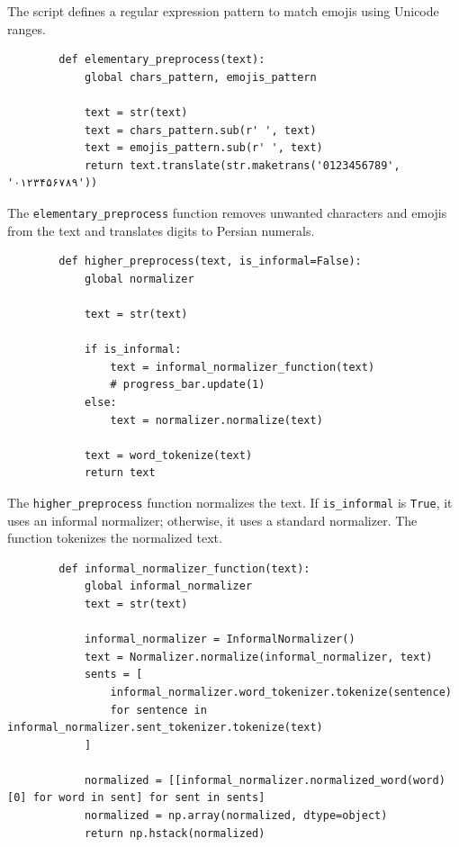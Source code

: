 \documentclass{solutionclass} %
\begin{document}
\begin{solution}
        The script defines a regular expression pattern to match emojis using Unicode ranges.
        
        \begin{lstlisting}
        def elementary_preprocess(text):
            global chars_pattern, emojis_pattern
        
            text = str(text)
            text = chars_pattern.sub(r' ', text)
            text = emojis_pattern.sub(r' ', text)
            return text.translate(str.maketrans('0123456789', '۰۱۲۳۴۵۶۷۸۹'))
        \end{lstlisting}
        
        The \texttt{elementary\_preprocess} function removes unwanted characters and emojis from the text and translates digits to Persian numerals.
        
        \begin{lstlisting}
        def higher_preprocess(text, is_informal=False):
            global normalizer
        
            text = str(text)
            
            if is_informal:
                text = informal_normalizer_function(text)
                # progress_bar.update(1)
            else:
                text = normalizer.normalize(text)
            
            text = word_tokenize(text)
            return text
        \end{lstlisting}
        
        The \texttt{higher\_preprocess} function normalizes the text. If \texttt{is\_informal} is \texttt{True}, it uses an informal normalizer; otherwise, it uses a standard normalizer. The function tokenizes the normalized text.
        
        \begin{lstlisting}
        def informal_normalizer_function(text):
            global informal_normalizer
            text = str(text)
        
            informal_normalizer = InformalNormalizer()
            text = Normalizer.normalize(informal_normalizer, text)
            sents = [
                informal_normalizer.word_tokenizer.tokenize(sentence)
                for sentence in informal_normalizer.sent_tokenizer.tokenize(text)
            ]
        
            normalized = [[informal_normalizer.normalized_word(word)[0] for word in sent] for sent in sents]
            normalized = np.array(normalized, dtype=object)
            return np.hstack(normalized)
        

\end{lstlisting}
\end{solution}
\end{document}
